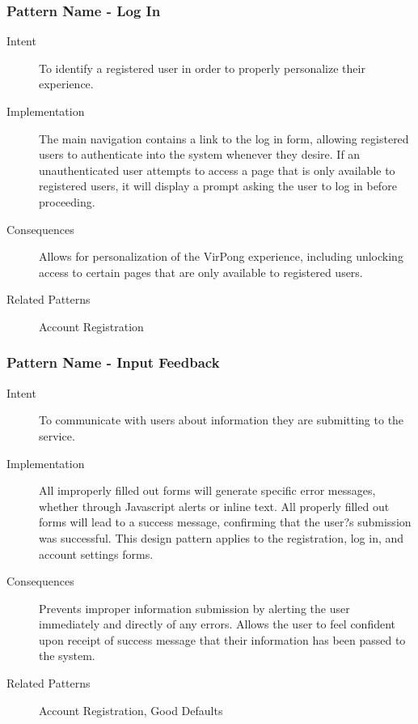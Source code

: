 		\subsubsection{Pattern Name - Log In}
			\begin{description}
				\item[Intent] To identify a registered user in order to properly personalize their experience.
				\item[Implementation] The main navigation contains a link to the log in form, allowing registered users to authenticate into the system whenever they desire. If an unauthenticated user attempts to access a page that is only available to registered users, it will display a prompt asking the user to log in before proceeding.
				\item[Consequences] Allows for personalization of the VirPong experience, including unlocking access to certain pages that are only available to registered users.
				\item[Related Patterns] Account Registration
			\end{description}
			
		\subsubsection{Pattern Name - Input Feedback}
			\begin{description}
				\item[Intent] To communicate with users about information they are submitting to the service.
				\item[Implementation] All improperly filled out forms will generate specific error messages, whether through Javascript alerts or inline text. All properly filled out forms will lead to a success message, confirming that the user?s submission was successful. This design pattern applies to the registration, log in, and account settings forms.
				\item[Consequences] Prevents improper information submission by alerting the user immediately and directly of any errors. Allows the user to feel confident upon receipt of success message that their information has been passed to the system.
				\item[Related Patterns] Account Registration, Good Defaults
			\end{description}
			
